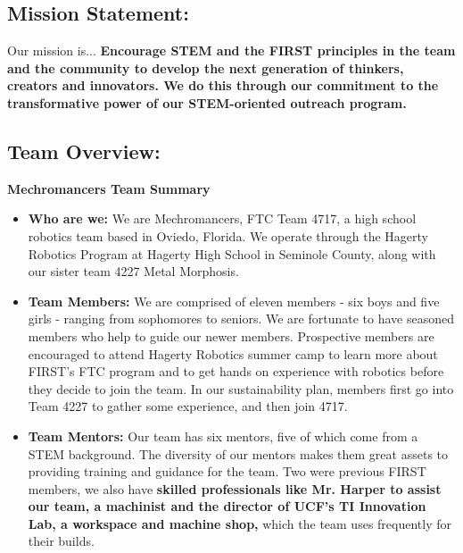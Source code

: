 \subsection*{\textbf{\Huge Mission Statement:}}
\vspace{.2cm}
\setlength{\parindent}{.25in} 

\large{Our mission is...}
\newline 
\textbf{Encourage STEM and the FIRST principles in the team and the community to develop the next generation of thinkers, creators and innovators. We do this through our commitment to the transformative power of our STEM-oriented outreach program.}

\subsection*{\textbf{\Huge Team Overview:}}
\vspace{.2cm}
\setlength{\parindent}{.25in} 

\textbf{\Large Mechromancers Team Summary}

\begin{itemize}
 \item \textbf{Who are we:} We are Mechromancers, FTC Team 4717, a high school robotics team based in Oviedo, Florida. We operate through the Hagerty Robotics Program at Hagerty High School in Seminole County, along with our sister team 4227 Metal Morphosis.
 \item \textbf{Team Members:}  We are comprised of eleven members -  six boys and five girls - ranging from sophomores to seniors. We are fortunate to have seasoned members who help to guide our newer members. Prospective members are encouraged to attend Hagerty Robotics summer camp to learn more about FIRST’s FTC program and to get hands on experience with robotics before they decide to join the team. In our sustainability plan, members first go into Team 4227 to gather some experience, and then join 4717.
 \item \textbf{Team Mentors:} Our team has six mentors, five of which come from a STEM background. The diversity of our mentors makes them great assets to providing training and guidance for the team. Two were previous FIRST members, we also have \textbf{skilled professionals like Mr. Harper to assist our team, a machinist and the director of UCF's TI Innovation Lab, a workspace and machine shop,} which the team uses frequently for their builds.
\end{itemize}

